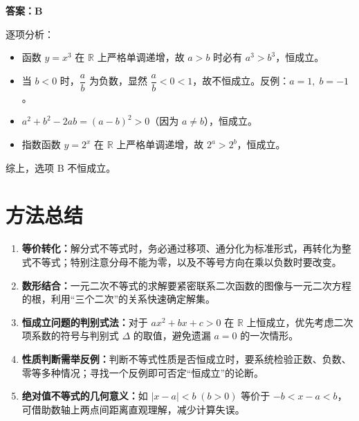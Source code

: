 \documentclass[11pt]{ctexrep}
\begin{document}
\begin{parse}
\textbf{答案：B}

逐项分析：
\begin{itemize}[leftmargin=1.5em]
    \item[A.] 函数 $y=x^3$ 在 $\mathbb{R}$ 上严格单调递增，故 $a>b$ 时必有 $a^3>b^3$，恒成立。
    \item[B.] 当 $b<0$ 时，$\dfrac{a}{b}$ 为负数，显然 $\dfrac{a}{b}<0<1$，故不恒成立。反例：$a=1,\;b=-1$。
    \item[C.] $a^2+b^2-2ab=(a-b)^2>0$（因为 $a\neq b$），恒成立。
    \item[D.] 指数函数 $y=2^x$ 在 $\mathbb{R}$ 上严格单调递增，故 $2^a>2^b$，恒成立。
\end{itemize}

综上，选项 B 不恒成立。
\end{parse}

\section*{方法总结}

\begin{enumerate}[label=\textbf{\arabic*.}]
    \item \textbf{等价转化：}解分式不等式时，务必通过移项、通分化为标准形式，再转化为整式不等式；特别注意分母不能为零，以及不等号方向在乘以负数时要改变。
    \item \textbf{数形结合：}一元二次不等式的求解要紧密联系二次函数的图像与一元二次方程的根，利用``三个二次''的关系快速确定解集。
    \item \textbf{恒成立问题的判别式法：}对于 $ax^2+bx+c>0$ 在 $\mathbb{R}$ 上恒成立，优先考虑二次项系数的符号与判别式 $\Delta$ 的取值，避免遗漏 $a=0$ 的一次情形。
    \item \textbf{性质判断需举反例：}判断不等式性质是否恒成立时，要系统检验正数、负数、零等多种情况；寻找一个反例即可否定``恒成立''的论断。
    \item \textbf{绝对值不等式的几何意义：}如 $|x-a|<b\;(b>0)$ 等价于 $-b<x-a<b$，可借助数轴上两点间距离直观理解，减少计算失误。
\end{enumerate}
\end{document}

